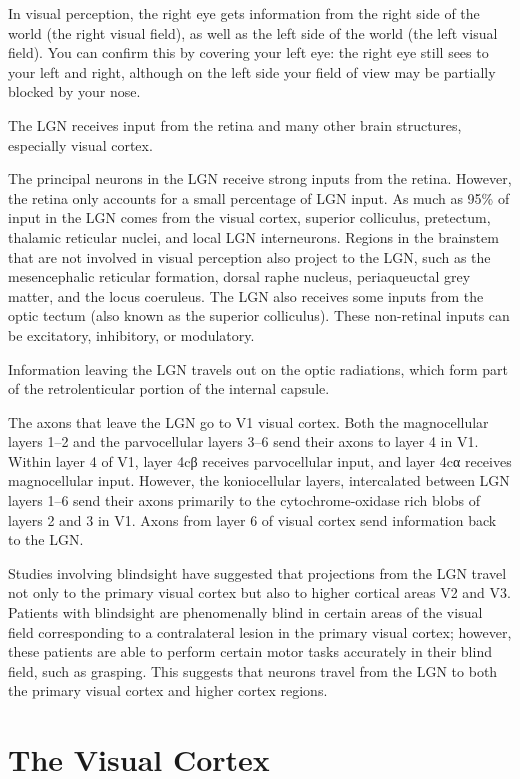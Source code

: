 In visual perception, the right eye gets information from the right side of the world (the right visual field), as well as the left side of the world (the left visual field). You can confirm this by covering your left eye: the right eye still sees to your left and right, although on the left side your field of view may be partially blocked by your nose.

The LGN receives input from the retina and many other brain structures, especially visual cortex.

The principal neurons in the LGN receive strong inputs from the retina. However, the retina only accounts for a small percentage of LGN input. As much as 95\% of input in the LGN comes from the visual cortex, superior colliculus, pretectum, thalamic reticular nuclei, and local LGN interneurons. Regions in the brainstem that are not involved in visual perception also project to the LGN, such as the mesencephalic reticular formation, dorsal raphe nucleus, periaqueuctal grey matter, and the locus coeruleus. The LGN also receives some inputs from the optic tectum (also known as the superior colliculus). These non-retinal inputs can be excitatory, inhibitory, or modulatory.

Information leaving the LGN travels out on the optic radiations, which form part of the retrolenticular portion of the internal capsule.

The axons that leave the LGN go to V1 visual cortex. Both the magnocellular layers 1--2 and the parvocellular layers 3--6 send their axons to layer 4 in V1. Within layer 4 of V1, layer 4cβ receives parvocellular input, and layer 4cα receives magnocellular input. However, the koniocellular layers, intercalated between LGN layers 1--6 send their axons primarily to the cytochrome-oxidase rich blobs of layers 2 and 3 in V1. Axons from layer 6 of visual cortex send information back to the LGN.

Studies involving blindsight have suggested that projections from the LGN travel not only to the primary visual cortex but also to higher cortical areas V2 and V3. Patients with blindsight are phenomenally blind in certain areas of the visual field corresponding to a contralateral lesion in the primary visual cortex; however, these patients are able to perform certain motor tasks accurately in their blind field, such as grasping. This suggests that neurons travel from the LGN to both the primary visual cortex and higher cortex regions.

\hypertarget{the-visual-cortex}{%
\section{The Visual Cortex}\label{the-visual-cortex}}

